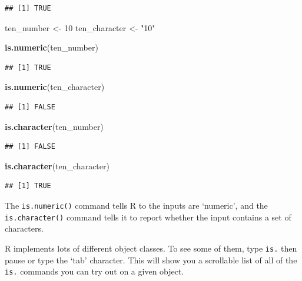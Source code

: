 \documentclass[]{article}
\newenvironment{Shaded}{\begin{snugshade}}{\end{snugshade}}
\newcommand{\KeywordTok}[1]{\textcolor[rgb]{0.13,0.29,0.53}{\textbf{#1}}}
\newcommand{\DecValTok}[1]{\textcolor[rgb]{0.00,0.00,0.81}{#1}}
\newcommand{\StringTok}[1]{\textcolor[rgb]{0.31,0.60,0.02}{#1}}
\newcommand{\NormalTok}[1]{#1}
\begin{document}
\begin{verbatim}
## [1] TRUE
\end{verbatim}

\begin{Shaded}
\begin{Highlighting}[]
\NormalTok{ten_number <-}\StringTok{ }\DecValTok{10}
\NormalTok{ten_character <-}\StringTok{ "10"}

\KeywordTok{is.numeric}\NormalTok{(ten_number)}
\end{Highlighting}
\end{Shaded}

\begin{verbatim}
## [1] TRUE
\end{verbatim}

\begin{Shaded}
\begin{Highlighting}[]
\KeywordTok{is.numeric}\NormalTok{(ten_character)}
\end{Highlighting}
\end{Shaded}

\begin{verbatim}
## [1] FALSE
\end{verbatim}

\begin{Shaded}
\begin{Highlighting}[]
\KeywordTok{is.character}\NormalTok{(ten_number)}
\end{Highlighting}
\end{Shaded}

\begin{verbatim}
## [1] FALSE
\end{verbatim}

\begin{Shaded}
\begin{Highlighting}[]
\KeywordTok{is.character}\NormalTok{(ten_character)}
\end{Highlighting}
\end{Shaded}

\begin{verbatim}
## [1] TRUE
\end{verbatim}

The \texttt{is.numeric()} command tells R to the inputs are `numeric',
and the \texttt{is.character()} command tells it to report whether the
input contains a set of characters.

R implements lots of different object classes. To see some of them, type
\texttt{is.} then pause or type the `tab' character. This will show you
a scrollable list of all of the \texttt{is.} commands you can try out on
a given object.
\end{document}
